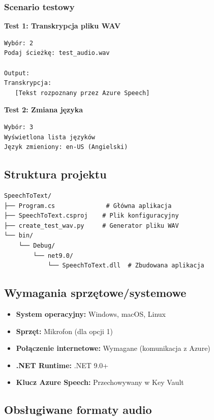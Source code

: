 \subsubsection{Scenario testowy}

\textbf{Test 1: Transkrypcja pliku WAV}

\begin{verbatim}
Wybór: 2
Podaj ścieżkę: test_audio.wav

Output:
Transkrypcja:
   [Tekst rozpoznany przez Azure Speech]
\end{verbatim}

\textbf{Test 2: Zmiana języka}

\begin{verbatim}
Wybór: 3
Wyświetlona lista języków
Język zmieniony: en-US (Angielski)
\end{verbatim}

\subsection{Struktura projektu}

\begin{verbatim}
SpeechToText/
├── Program.cs              # Główna aplikacja
├── SpeechToText.csproj    # Plik konfiguracyjny
├── create_test_wav.py     # Generator pliku WAV
└── bin/
    └── Debug/
        └── net9.0/
            └── SpeechToText.dll  # Zbudowana aplikacja
\end{verbatim}

\subsection{Wymagania sprzętowe/systemowe}

\begin{itemize}
	\item \textbf{System operacyjny:} Windows, macOS, Linux
	\item \textbf{Sprzęt:} Mikrofon (dla opcji 1)
	\item \textbf{Połączenie internetowe:} Wymagane (komunikacja z Azure)
	\item \textbf{.NET Runtime:} .NET 9.0+
	\item \textbf{Klucz Azure Speech:} Przechowywany w Key Vault
\end{itemize}

\subsection{Obsługiwane formaty audio}

